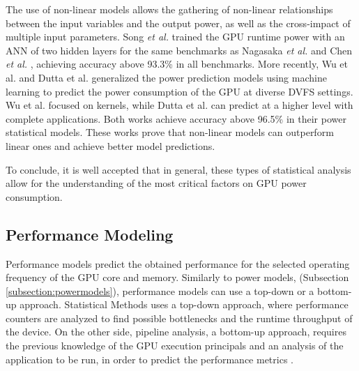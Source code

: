 The use of non-linear models allows the gathering of non-linear relationships between the input variables and the output power, as well as the cross-impact of multiple input parameters. Song \textit{et al.} \cite{song_simplified_2013} trained the GPU runtime power with an ANN of two hidden layers for the same benchmarks as Nagasaka \textit{et al.} \cite{nagasaka_statistical_2010} and Chen \textit{et al.} \cite{chen_statistical_2011}, achieving accuracy above 93.3\% in all benchmarks. More recently, Wu et al. \cite{wu_gpgpu_2015} and Dutta et al. \cite{dutta_gpu_2018} generalized the power prediction models using machine learning to predict the power consumption of the GPU at diverse DVFS settings. Wu et al. focused on kernels, while Dutta et al. can predict at a higher level with complete applications. Both works achieve accuracy above 96.5\% in their power statistical models. These works prove that non-linear models can outperform linear ones and achieve better model predictions.

\bigskip
To conclude, it is well accepted that in general, these types of statistical analysis allow for the understanding of the most critical factors on GPU power consumption.    

\subsection{Performance Modeling}
\label{subsection:performancemodels}

Performance models predict the obtained performance for the selected operating frequency of the GPU core and memory. Similarly to power models, (Subsection \ref{subsection:powermodels}), performance models can use a top-down or a bottom-up approach. Statistical Methods uses a top-down approach, where performance counters are analyzed to find possible bottlenecks and the runtime throughput of the device. On the other side, pipeline analysis, a bottom-up approach, requires the previous knowledge of the GPU execution principals and an analysis of the application to be run, in order to predict the performance metrics \cite{mei_survey_2016}. 


